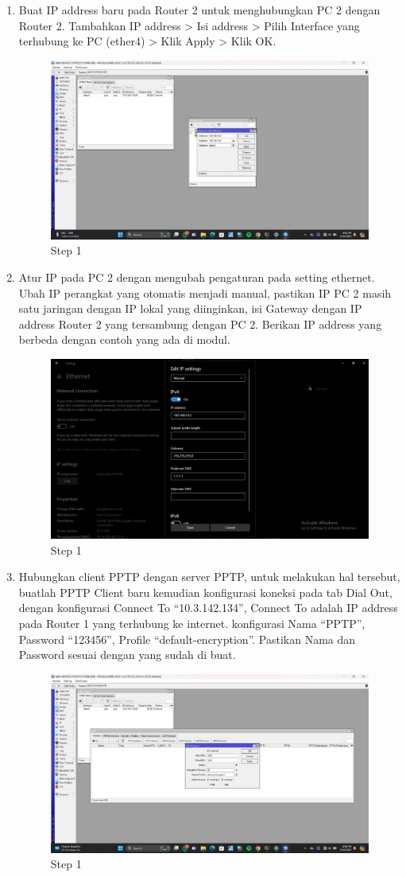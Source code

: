 \begin{enumerate}
	\item Buat IP address baru pada Router 2 untuk menghubungkan PC 2 dengan Router 2. Tambahkan
	IP address > Isi address > Pilih Interface yang terhubung ke PC (ether4) > Klik Apply > Klik OK.
	
	\begin{figure}[H]
		\centering
		\includegraphics[width=0.5\linewidth]{P4/img/2step3.jpg}
		\caption{Step 1}
		\label{fig:gambar1}
	\end{figure}

	\item Atur IP pada PC 2 dengan mengubah pengaturan pada setting ethernet. Ubah IP perangkat
	yang otomatis menjadi manual, pastikan IP PC 2 masih satu jaringan dengan IP lokal yang
	diinginkan, isi Gateway dengan IP address Router 2 yang tersambung dengan PC 2. Berikan
	IP address yang berbeda dengan contoh yang ada di modul.
	
	\begin{figure}[H]
		\centering
		\includegraphics[width=0.5\linewidth]{P4/img/2step4.jpg}
		\caption{Step 1}
		\label{fig:gambar1}
	\end{figure}

	\item Hubungkan client PPTP dengan server PPTP, untuk melakukan hal tersebut, buatlah PPTP
	Client baru kemudian konfigurasi koneksi pada tab Dial Out, dengan konfigurasi Connect To
	“10.3.142.134”, Connect To adalah IP address pada Router 1 yang terhubung ke internet. konfigurasi Nama “PPTP”, Password “123456”, Profile “default-encryption”. Pastikan Nama dan
	Password sesuai dengan yang sudah di buat.
	
	\begin{figure}[H]
		\centering
		\includegraphics[width=0.5\linewidth]{P4/img/2step5.jpg}
		\caption{Step 1}
		\label{fig:gambar1}
	\end{figure}


\end{enumerate}
